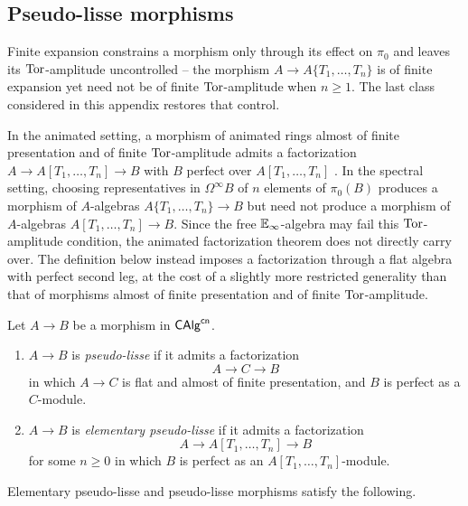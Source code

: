 \subsection{Pseudo-lisse morphisms}\label{subsec: pseudo-lisse morphisms}
Finite expansion constrains a morphism only through its effect on $\pi_{0}$ and leaves its $\mathrm{Tor}$-amplitude uncontrolled -- the morphism $A\to A\{T_{1},\dots,T_{n}\}$ is of finite expansion yet need not be of finite $\mathrm{Tor}$-amplitude when $n\geq 1$. The last class considered in this appendix restores that control. 

In the animated setting, a morphism of animated rings almost of finite presentation and of finite $\mathrm{Tor}$-amplitude admits a factorization $A\to A[T_{1},\dots,T_{n}]\to B$ with $B$ perfect over $A[T_{1},\dots,T_{n}]$ \cite[Lem. 2.7.12 (iv)]{HansenMannCLL}. In the spectral setting, choosing representatives in $\Omega^{\infty}B$ of $n$ elements of $\pi_{0}(B)$ produces a morphism of $A$-algebras $A\{T_{1},\dots,T_{n}\}\to B$ but need not produce a morphism of $A$-algebras $A[T_{1},\dots,T_{n}]\to B$. Since the free $\mathbb{E}_{\infty}$-algebra may fail this $\mathrm{Tor}$-amplitude condition, the animated factorization theorem does not directly carry over. The definition below instead imposes a factorization through a flat algebra with perfect second leg, at the cost of a slightly more restricted generality than that of morphisms almost of finite presentation and of finite $\mathrm{Tor}$-amplitude.
\begin{definition}\label{def: pseudo-lisse appendix}
    Let $A\to B$ be a morphism in $\mathsf{CAlg}^{\mathsf{cn}}$.
    \begin{enumerate}
        \item $A\to B$ is \emph{pseudo-lisse} if it admits a factorization
        $$A\to C\to B$$
        in which $A\to C$ is flat and almost of finite presentation, and $B$ is perfect as a $C$-module.
        \item $A\to B$ is \emph{elementary pseudo-lisse} if it admits a factorization
        $$A\to A[T_{1},\dots,T_{n}]\to B$$
        for some $n\geq 0$ in which $B$ is perfect as an $A[T_{1},\dots,T_{n}]$-module.
    \end{enumerate}
\end{definition}
Elementary pseudo-lisse and pseudo-lisse morphisms satisfy the following. 
